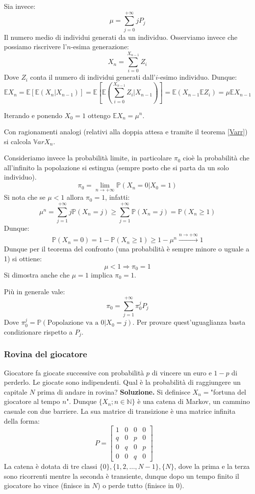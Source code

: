 Sia invece:
\[\mu=\sum_{j=0}^{+\infty}jP_j\]
Il numero medio di individui generati da un individuo. Osserviamo invece che possiamo riscrivere l'$n$-esima generazione:
\[X_n=\sum_{i=0}^{X_{n-1}}Z_i\]
Dove $Z_i$ conta il numero di individui generati dall'$i$-esimo individuo. Dunque:
\[\mathbb{E}X_n=\mathbb{E}\left[\mathbb{E}\left(X_n|X_{n-1}\right)\right]=\mathbb{E}\left[\mathbb{E}\left(\sum_{i=0}^{X_{n-1}}Z_i|X_{n-1}\right)\right]=\mathbb{E}(X_{n-1}\mathbb{E}Z_i)=\mu\mathbb{E}X_{n-1}\]

Iterando e ponendo $X_0=1$ ottengo $\mathbb{E}X_n=\mu^n$.

Con ragionamenti analogi (relativi alla doppia attesa e tramite il teorema \ref{Varr}) si calcola $\mathbb{V}ar X_n$.

Consideriamo invece la probabilità limite, in particolare $\pi_0$ cioè la probabilità che all'infinito la popolazione si estingua (sempre posto che si parta da un solo individuo). 
\[\pi_0=\lim_{n\to+\infty}\mathbb{P}(X_n=0|X_0=1)\]
Si nota che se $\mu<1$ allora $\pi_0=1$, infatti:
\[\mu^n=\sum_{j=1}^{+\infty}j\mathbb{P}(X_n=j)\geq \sum_{j=1}^{+\infty}\mathbb{P}(X_n=j)=\mathbb{P}(X_n\geq 1)\]
Dunque:
\[\mathbb{P}(X_n=0)=1-\mathbb{P}(X_n\geq1)\geq1-\mu^n\xrightarrow{n\to+\infty}1\]
Dunque per il teorema del confronto (una probabilità è sempre minore o uguale a 1) si ottiene:
\[\mu<1\Rightarrow\pi_0=1\]
Si dimostra anche che $\mu=1$ implica $\pi_0=1$.

Più in generale vale:
\[\pi_0=\sum_{j=1}^{+\infty}\pi_0^jP_j\]
Dove $\pi_0^j=\mathbb{P}(\text{Popolazione va a }0|X_0=j)$. Per provare quest'uguaglianza basta condizionare rispetto a $P_j$.
\vspace{15px}

\subsubsection{Rovina del giocatore} \label{Rov_gioc}
Giocatore fa giocate successive con probabilità $p$ di vincere un euro e $1-p$ di perderlo. Le giocate sono indipendenti. Qual è la probabilità di raggiungere un capitale $N$ prima di andare in rovina?
\newline
\textbf{Soluzione.}
\newline
Si definisce $X_n=$"fortuna del giocatore  al tempo $n$". Dunque $\{X_n ; n\in\mathbb{N}\}$ è una catena di Markov, un cammino casuale con due barriere. La sua matrice di transizione è una matrice infinita della forma:
\[P = \begin{bmatrix}
1& 0 & 0 & 0
\\q & 0 & p & 0 
\\0 & q & 0 & p 
\\0 & 0 & q & 0 
\end{bmatrix}
\quad\]
La catena è dotata di tre classi $\{0\},\{1,2,\dots,N-1\},\{N\}$, dove la prima e la terza sono ricorrenti mentre la seconda è transiente, dunque dopo un tempo finito il giocatore ho vince (finisce in $N$) o perde tutto (finisce in $0$).

